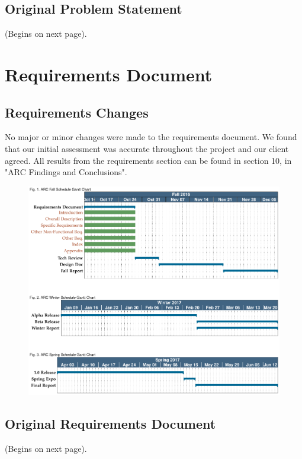 \documentclass[compsoc,draftclsnofoot,onecolumn,10pt]{IEEEtran}
\begin{document}
\subsection{Original Problem Statement}
(Begins on next page).



\clearpage
\section{Requirements Document}

\subsection{Requirements Changes}
No major or minor changes were made to the requirements document. We found that our initial assessment was accurate throughout the project and our client agreed. All results from the requirements section can be found in section 10, in "ARC Findings and Conclusions".
\begin{figure}[h!]
\includegraphics[scale=.5]{gantt}
\end{figure}

\subsection{Original Requirements Document}
(Begins on next page).

% 
\end{document}
